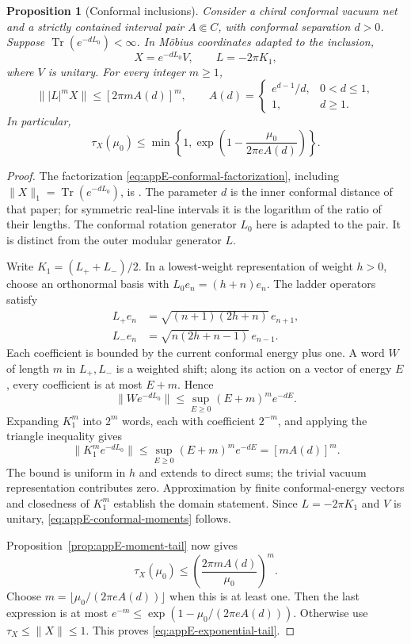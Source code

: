 \documentclass[a4paper,11pt]{article}
\newtheorem{proposition}[theorem]{Proposition}
\theoremstyle{definition}
\begin{document}
\begin{proposition}[Conformal inclusions]
\label{prop:appE-conformal-tail}
Consider a chiral conformal vacuum net and a strictly contained interval pair $A\Subset C$, with conformal separation $d>0$. Suppose $\operatorname{Tr}(e^{-dL_0})<\infty$. In M\"obius coordinates adapted to the inclusion,
\begin{equation}
 X=e^{-dL_0}V,\qquad L=-2\pi K_1,
 \label{eq:appE-conformal-factorization}
\end{equation}
where $V$ is unitary. For every integer $m\ge1$,
\begin{equation}
 \||L|^mX\|\le[2\pi mA(d)]^m,
 \qquad
 A(d)=\begin{cases}
 e^{d-1}/d,&0<d\le1,\\
 1,&d\ge1.
 \end{cases}
 \label{eq:appE-conformal-moments}
\end{equation}
In particular,
\begin{equation}
 \tau_X(\mu_0)\le
 \min\left\{1,\exp\left(1-\frac{\mu_0}{2\pi eA(d)}\right)\right\}.
 \label{eq:appE-exponential-tail}
\end{equation}
\end{proposition}
\begin{proof}
The factorization \eqref{eq:appE-conformal-factorization}, including
$\|X\|_1=\operatorname{Tr}(e^{-dL_0})$,
is \cite[Proposition~3.1]{BDL2007}. The parameter $d$ is the inner conformal distance of that paper; for symmetric real-line intervals it is the logarithm of the ratio of their lengths. The conformal rotation generator $L_0$ here is adapted to the pair. It is distinct from the outer modular generator $L$.

Write $K_1=(L_++L_-)/2$. In a lowest-weight representation of weight $h>0$, choose an orthonormal basis with $L_0e_n=(h+n)e_n$. The ladder operators satisfy
\begin{align*}
 L_+e_n&=\sqrt{(n+1)(2h+n)}\,e_{n+1},\\
 L_-e_n&=\sqrt{n(2h+n-1)}\,e_{n-1}.
\end{align*}
Each coefficient is bounded by the current conformal energy plus one. A word $W$ of length $m$ in $L_+,L_-$ is a weighted shift; along its action on a vector of energy $E$, every coefficient is at most $E+m$. Hence
\[
 \|We^{-dL_0}\|\le\sup_{E\ge0}(E+m)^m e^{-dE}.
\]
Expanding $K_1^m$ into $2^m$ words, each with coefficient $2^{-m}$, and applying the triangle inequality gives
\[
 \|K_1^me^{-dL_0}\|
 \le\sup_{E\ge0}(E+m)^m e^{-dE}
 =[mA(d)]^m.
\]
The bound is uniform in $h$ and extends to direct sums; the trivial vacuum representation contributes zero. Approximation by finite conformal-energy vectors and closedness of $K_1^m$ establish the domain statement. Since $L=-2\pi K_1$ and $V$ is unitary, \eqref{eq:appE-conformal-moments} follows.

Proposition~\ref{prop:appE-moment-tail} now gives
\[
 \tau_X(\mu_0)\le
 \left(\frac{2\pi mA(d)}{\mu_0}\right)^m.
\]
Choose $m=\lfloor\mu_0/(2\pi eA(d))\rfloor$ when this is at least one. Then the last expression is at most $e^{-m}\le\exp(1-\mu_0/(2\pi eA(d)))$. Otherwise use $\tau_X\le\|X\|\le1$. This proves \eqref{eq:appE-exponential-tail}.
\end{proof}
\end{document}
